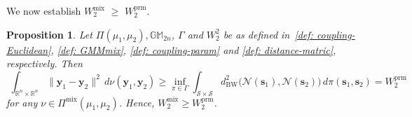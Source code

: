 \documentclass[opre,sglanonrev]{informs4}
\newtheorem{proposition}{Proposition}
\newcommand{\mS}{\mathcal{S}}
\newcommand{\mN}{\mathcal{N}}
\newcommand{\mbR}{\mathbb R}
\newcommand{\mbGM}{\mathbb{GM}}
\newcommand{\bs}{\bm{s}}
\newcommand{\by}{\bm{y}}
\begin{document}
We now establish $ W_2^\mathrm{mix}\,\, \geq \,\, W_2^\mathrm{prm}$.



\begin{proposition}\label{thm: R>=L}
 Let $\Pi(\mu_1, \mu_2), \mbGM_{2n}$, $\Gamma$ and $W_2^2$ be as defined  in~\eqref{def: coupling-Euclidean}, \eqref{def: GMMmix}, \eqref{def: coupling-param} and \eqref{def: distance-matric}, respectively. Then 
\[\,\, \int_{\mbR^n \times \mbR^n}
      \|\by_1 - \by_2\|^2 \,d\nu(\by_1,\by_2)  \geq \inf_{\pi \in \Gamma}\int_{\mS\times \mS}           d^2_{\mathrm{BW}}\bigl(\mN(\bs_1),\mN(\bs_2)\bigr)\,d\pi(\bs_1, \bs_2) = W_2^\mathrm{prm}
      \]
for any $\nu \in \Pi^\mathrm{mix}(\mu_1, \mu_2)$. Hence, $W_2^\mathrm{mix} \geq W_2^\mathrm{prm}$.
\end{proposition}
\end{document}
